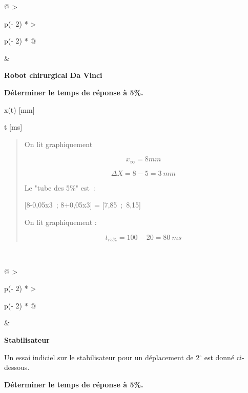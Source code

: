 \begin{longtable}[]{@{}
  >{\raggedright\arraybackslash}p{(\columnwidth - 2\tabcolsep) * }
  >{\raggedright\arraybackslash}p{(\columnwidth - 2\tabcolsep) * }@{}}
\toprule\noalign{}
\begin{minipage}[b]{\linewidth}\raggedright
\begin{quote}
\end{quote}
\end{minipage} & \begin{minipage}[b]{\linewidth}\raggedright
{}\textbf{Robot
chirurgical Da Vinci}

\textbf{Déterminer le temps de réponse à 5\%.}

x(t) {[}mm{]}


t {[}ms{]}

\begin{quote}
On lit graphiquement

\[x_{\infty} = 8mm\]

\[\Delta X = 8 - 5 = 3\ mm\]

Le "tube des 5\%" est~:

{[}8-0,05x3~; 8+0,05x3{]} = {[}7,85~;~8,15{]}

On lit graphiquement :

\[t_{r5\%} = 100 - 20 = 80\ ms\]
\end{quote}
\end{minipage} \\
\midrule\noalign{}
\endhead
\bottomrule\noalign{}
\endlastfoot
\end{longtable}

\begin{longtable}[]{@{}
  >{\raggedright\arraybackslash}p{(\columnwidth - 2\tabcolsep) * }
  >{\raggedright\arraybackslash}p{(\columnwidth - 2\tabcolsep) * }@{}}
\toprule\noalign{}
\begin{minipage}[b]{\linewidth}\raggedright
\begin{quote}
\end{quote}
\end{minipage} & \begin{minipage}[b]{\linewidth}\raggedright
{}\textbf{Stabilisateur}

Un essai indiciel sur le stabilisateur pour un déplacement de 2$^\circ$ est
donné ci-dessous.


\textbf{Déterminer le temps de réponse à 5\%.}
\end{minipage} \\
\midrule\noalign{}
\endhead
\bottomrule\noalign{}
\endlastfoot
\end{longtable}

